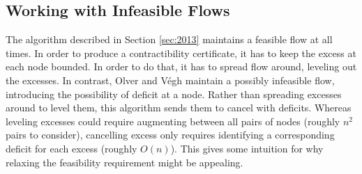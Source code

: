 \documentclass[11pt]{article}
\makeatletter
\let\comment\todo
\newcommand{\katie}[1]{\comment[nolist,color=green!40]{@katie\\ #1}}
\theoremstyle{definition}
\theoremstyle{definition}
\theoremstyle{definition}
\renewcommand{\todo}[1]{\hl{TODO: #1}}
\makeatother
\begin{document}
	
	
    

	\subsection{Working with Infeasible Flows}\label{sec:infeasible}
	The algorithm described in Section \ref{sec:2013} maintains a feasible flow
	at all times. In order to produce a contractibility certificate, it has
	to keep the excess at each node bounded. In order to do that, it has to spread
	flow around, leveling out the excesses. In contrast, Olver and V\'egh \cite{Olver2017} maintain
	a possibly infeasible flow, introducing the possibility of deficit at a node. Rather than
    spreading excesses around to level them, this algorithm sends them
    to cancel with deficits. Whereas leveling excesses could require augmenting between all pairs of
	nodes (roughly $n^2$ pairs to consider), cancelling excess only requires identifying
	a corresponding deficit for each excess (roughly $O(n)$). This gives some intuition
    for why relaxing the feasibility requirement might be appealing.
	
\end{document}
